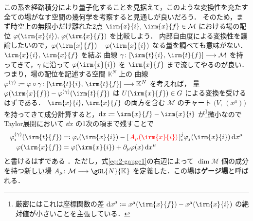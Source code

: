 \documentclass[geometry_main]{subfiles}
\begin{document}
この系を経路積分により量子化することを見据えて，このような変換性を充たす全ての場がなす空間の幾何学を考察すると見通しが良いだろう．
そのため，まず時空上の無限小だけ離れた2点 $\irm{x}{i},\, \irm{x}{f} \in \mathcal{M}$ における場の配位 $\varphi(\irm{x}{i}),\, \varphi(\irm{x}{f})$ を比較しよう．
内部自由度による変換性を議論したいので，$\varphi (\irm{x}{f}) - \varphi(\irm{x}{i})$ なる量を調べても意味がない．$\irm{x}{i},\, \irm{x}{f}$ を結ぶ \cinfty 曲線 $\gamma \colon [\irm{t}{i},\, \irm{t}{f}] \lto \mathcal{M}$ を持ってきて，$\gamma$ に沿って $\varphi(\irm{x}{i})$ を $\irm{x}{f}$ まで流してやるのが良い．つまり，場の配位を記述する空間 $\mathbb{K}^N$ 上の \cinfty 曲線 $\varphi^{(\gamma)} \coloneqq \varphi \circ \gamma \colon [\irm{t}{i},\, \irm{t}{f}] \lto \mathbb{K}^N$ を考えれば，
量 $\varphi (\irm{x}{f}) - \varphi^{(\gamma)}(\irm{t}{f})$ は $U(\irm{x}{f}) \in G$ による変換を受けるはずである．
$\irm{x}{i},\, \irm{x}{f}$ の両方を含む $\mathcal{M}$ のチャート $\bigl( V,\, (x^\mu) \bigr)$ を持ってきて成分計算すると，$\dd{x} \coloneqq \irm{x}{f} - \irm{x}{i}$ が\footnote{厳密にはこれは座標関数の差 $\dd{x}^\mu \coloneqq x^\mu(\irm{x}{f}) - x^\mu(\irm{x}{i})$ の絶対値が小さいことを主張している．}微小なのでTaylor展開において $\dd{x}$ の1次の項まで残すことで
\begin{align}
    \varphi^{(\gamma)}_i(\irm{t}{f}) &\eqqcolon \varphi_i (\irm{x}{i}) - [\, \textcolor{red}{A_\mu(\irm{x}{i})} \,]^j_i \varphi_j (\irm{x}{i}) \dd{x}^\mu \label{eq:2-gauge1} \\
    \varphi(\irm{x}{f}) &= \varphi (\irm{x}{i}) + \partial_\mu \varphi (x) \dd{x}^\mu
\end{align}
と書けるはずである
．ただし，式\eqref{eq:2-gauge1}の右辺によって $\dim \mathcal{M}$ 個の成分を持つ\underline{新しい場} $A_\mu \colon \mathcal{M} \lto \gGL{N}{\mathbb{K}}$ を定義した．この場は\textbf{ゲージ場}と呼ばれる．
\end{document}
